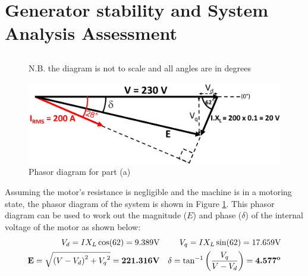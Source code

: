 \newpage
\section{Generator stability and System Analysis Assessment}
\renewcommand{\thesubsection}{\thesection.\alph{subsection}}
    \subsection{}
        \vspace{-5mm}
        \begin{figure}[tbh!]
            \centering
            \caption*{N.B. the diagram is not to scale and all angles are in degrees}
            \includegraphics[width=\linewidth]{PEMDT Exam Report/img/Phasor Diagram.png}
            \caption{Phasor diagram for part (a)}
            \label{fig: phasor diagram}
        \end{figure}

        Assuming the motor's resistance is negligible and the machine is in a motoring state, the phasor diagram of the system is shown in Figure \ref{fig: phasor diagram}. This phasor diagram can be used to work out the magnitude (\(E\)) and phase (\(\delta\)) of the internal voltage of the motor as shown below:
        \begin{align}
            V_d = IX_L \cos(62) = 9.389 \text{V} && V_q = IX_L \sin(62) = 17.659 \text{V} \\
            \textbf{E} = \sqrt{\left(V - V_d\right)^2 + {V_{q}}^2} = \textbf{221.316} \text{\textbf{V}} && \delta = \tan^{-1}\left(\frac{V_q}{V - V_d}\right) = \textbf{4.577}^\textbf{o}
        \end{align}

